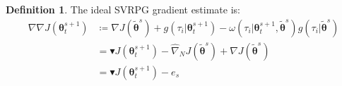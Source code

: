 \documentclass{article}
\theoremstyle{remark}
\theoremstyle{definition}
\newtheorem{definition}{Definition}[section]
\DeclareMathOperator*{\EV}{\mathbb{E}}
\DeclareMathOperator*{\Var}{\mathbb{V}ar}
\newcommand{\EVV}[2][\ppvect \in \ppspace]{\EV_{#1}\left[{#2}\right]}
\newcommand{\dnabla}{\nabla\!\!\!\!\nabla}
\newcommand{\vtheta}{\boldsymbol{\theta}}
\newcommand{\Reward}{\mathcal{R}}
\newcommand{\gradJ}[1]{\nabla J(#1)}
\newcommand{\gradApp}[2]{\widehat{\nabla}_{#2}J(#1)}
\newcommand{\gradBlack}[1]{\blacktriangledown J(#1)}
\newcommand{\gradIdeal}[1]{\dnabla J(#1)}
\newcommand{\wt}[1]{\widetilde{#1}}
\begin{document}
\begin{definition}\label{def:ideal}
The ideal SVRPG gradient estimate is:
\begin{align*}
	\gradIdeal{\vtheta_t^{s+1}} &\coloneqq 
	\gradJ{\wt{\vtheta}^s}
    + g(\tau_i|\vtheta^{s+1}_t)
    - \omega(\tau_i|\vtheta^{s+1}_t, \wt{\vtheta}^s) g(\tau_i|\wt{\vtheta}^s)
    \\
	&= \gradBlack{\vtheta_t^{s+1}} - \gradApp{\wt{\vtheta}^s}{N} + \gradJ{\wt{\vtheta}^s} \\
	&= \gradBlack{\vtheta_t^{s+1}} - e_s
\end{align*}
\end{definition}


%
%
\end{document}
